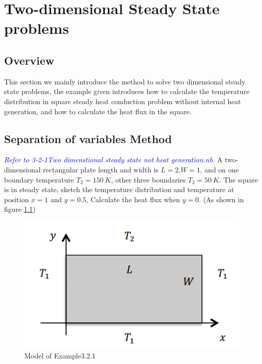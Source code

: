 \chapter{Two-dimensional Steady State problems}
\section{Overview}
This section we mainly introduce the method to solve two dimensional steady state problems, the example given introduces how to calculate the temperature distribution in square steady heat conduction problem without internal heat generation, and how to calculate the heat flux in the square.
\section{Separation of variables Method}
\begin{example}
\textcolor{blue} {\emph{Refer to 3-2-1Two dimenstional steady state not heat generation.nb.}}
A two-dimensional rectangular plate length and width is $L=2$,$W=1$, and on one 
boundary temperature $T_2=150~K$, other three boundaries $T_2=50~K$. The square 
is in steady state, sketch the temperature distribution and temperature at position $x=1$ and $y=0.5$,
Calculate the heat flux when $y=0$. (As shown in figure \ref{fig:3:1})
\begin{figure}[h!]
  \centering
    \includegraphics[scale=0.8]{figures/ch3/1}
    \caption{Model of Example3.2.1}
    \label{fig:3:1}
\end{figure}
\end{example}

